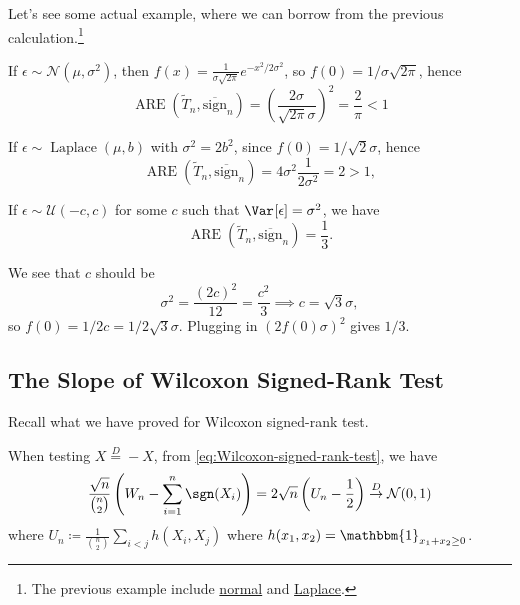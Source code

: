 Let's see some actual example, where we can borrow from the previous calculation.\footnote{The previous example include \hyperref[eg:ARE-normal]{normal} and \hyperref[eg:ARE-Laplace]{Laplace}.}

\begin{eg}[Gaussian]
	If \(\epsilon \sim \mathcal{N} (\mu , \sigma ^2)\), then \(f(x) = \frac{1}{\sigma \sqrt{2\pi } } e^{- x^2 / 2\sigma ^2}\), so \(f(0) = 1 / \sigma \sqrt{2\pi } \), hence
	\[
		\operatorname{ARE}(\widetilde{T} _n, \overline{\mathrm{sign}} _n)
		= \left( \frac{2\sigma }{\sqrt{2\pi } \sigma } \right) ^2
		= \frac{2}{\pi }
		< 1
	\]
\end{eg}

\begin{eg}[Laplace]
	If \(\epsilon \sim \operatorname{Laplace}(\mu , b) \) with \(\sigma ^2 = 2 b^2\), since \(f(0) = 1 /\sqrt{2} \sigma \), hence
	\[
		\operatorname{ARE}(\widetilde{T} _n, \overline{\mathrm{sign}} _n)
		= 4 \sigma ^2 \frac{1}{2 \sigma ^2}
		= 2
		> 1,
	\]
\end{eg}

\begin{eg}[Uniform]
	If \(\epsilon \sim \mathcal{U} (-c, c)\) for some \(c\) such that \(\Var_{}[\epsilon ] = \sigma ^2\), we have
	\[
		\operatorname{ARE}(\widetilde{T} _n, \overline{\mathrm{sign}} _n)
		= \frac{1}{3}.
	\]
\end{eg}
\begin{explanation}
	We see that \(c\) should be
	\[
		\sigma ^2
		= \frac{(2c)^2}{12}
		= \frac{c^2}{3}
		\implies c = \sqrt{3} \sigma ,
	\]
	so \(f(0) = 1 / 2c = 1 / 2 \sqrt{3} \sigma \). Plugging in \((2 f(0) \sigma )^2\) gives \(1 / 3\).
\end{explanation}

\subsection{The Slope of Wilcoxon Signed-Rank Test}
Recall what we have proved for Wilcoxon signed-rank test.

\begin{prev}
	When testing \(X \overset{D}{=} -X\), from \autoref{eq:Wilcoxon-signed-rank-test}, we have
	\[
		\frac{\sqrt{n}}{\binom{n}{2}}  \left( W_n - \sum_{i=1}^{n} \sgn (X_i) \right)
		= 2 \sqrt{n} \left( U_n - \frac{1}{2} \right)
		\overset{D}{\to} \mathcal{N} (0, 1)
	\]
	where \(U_n \coloneqq \frac{1}{\binom{n}{2}} \sum_{i < j} h(X_i, X_j)\) where \(h(x_1, x_2) = \mathbbm{1}_{x_1 + x_2 \geq 0} \).
\end{prev}

